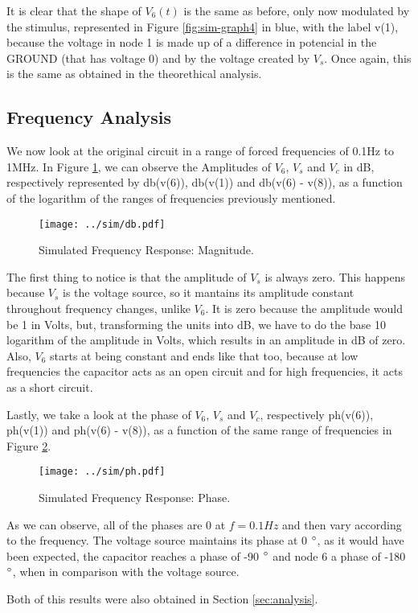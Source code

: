 It is clear that the shape of $V_6(t)$ is the same as before, only now modulated by the stimulus, represented in Figure \ref{fig:sim-graph4} in blue, with the label v(1), because the voltage in node 1 is made up of a difference in potencial in the GROUND (that has voltage 0) and by the voltage created by $V_s$. Once again, this is the same as obtained in the theorethical analysis.

\subsection{Frequency Analysis}
\label{subsec:sim_freq}

We now look at the original circuit in a range of forced frequencies of 0.1Hz to 1MHz. In Figure \ref{fig:sim_db}, we can observe the Amplitudes of $V_6$, $V_s$ and $V_c$ in dB, respectively represented by db(v(6)), db(v(1)) and db(v(6) - v(8)), as a function of the logarithm of the ranges of frequencies previously mentioned.

\begin{figure}[H] \centering
\texttt{[image: ../sim/db.pdf]}
\caption{Simulated Frequency Response: Magnitude.}
\label{fig:sim_db}
\end{figure}

The first thing to notice is that the amplitude of $V_s$ is always zero. This happens because $V_s$ is the voltage source, so it mantains its amplitude constant throughout frequency changes, unlike $V_6$. It is zero because the amplitude would be 1 in Volts, but, transforming the units into dB, we have to do the base 10 logarithm of the amplitude in Volts, which results in an amplitude in dB of zero. Also, $V_6$ starts at being constant and ends like that too, because at low frequencies the capacitor acts as an open circuit and for high frequencies, it acts as a short circuit.
\par
Lastly, we take a look at the phase of $V_6$, $V_s$ and $V_c$, respectively ph(v(6)), ph(v(1)) and ph(v(6) - v(8)), as a function of the same range of frequencies in Figure \ref{fig:sim_ph}.

\begin{figure}[H] \centering
\texttt{[image: ../sim/ph.pdf]}
\caption{Simulated Frequency Response: Phase.}
\label{fig:sim_ph}
\end{figure}


As we can observe, all of the phases are 0 at $f=0.1Hz$ and then vary according to the frequency. The voltage source maintains its phase at 0 $\degree$, as it would have been expected, the capacitor reaches a phase of -90 $\degree$ and node 6 a phase of -180 $\degree$, when in comparison with the voltage source.
\par
Both of this results were also obtained in Section \ref{sec:analysis}.












